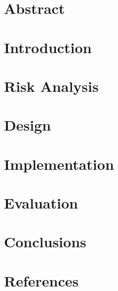 \documentclass[11pt]{article}
\begin{document}

\clearpage

\onehalfspacing{}

\section*{Abstract}
\label{sec:abstract}

\clearpage

\tableofcontents
\clearpage

\section{Introduction}
\label{sec:intro}


\section{Risk Analysis}
\label{sec:risk}


\clearpage
\section{Design}
\label{sec:design}


\clearpage
\section{Implementation}
\label{sec:impl}


\clearpage
\section{Evaluation}
\label{sec:eval}


\clearpage
\section{Conclusions}
\label{sec:conclusions}


\newpage
\section{References}
\begingroup
\renewcommand{\section}[2]{}%

\endgroup
\end{document}
